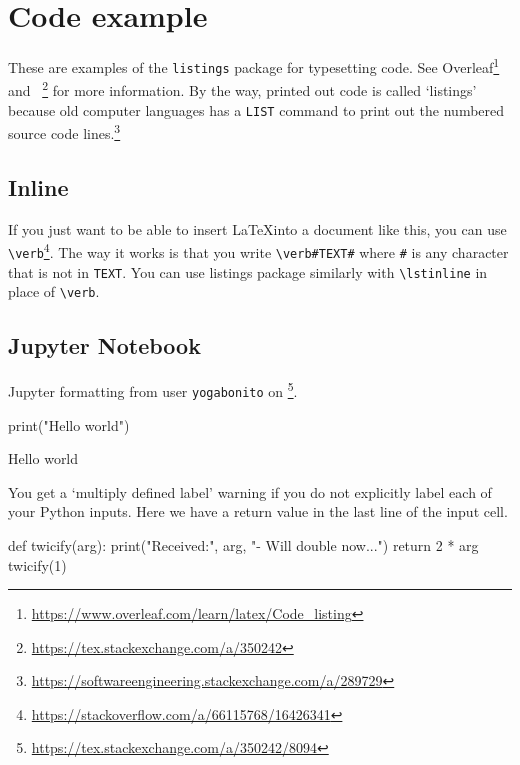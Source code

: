 
\section{Code example}

These are examples of the \texttt{listings} package for typesetting code. See Overleaf\footnote{\url{https://www.overleaf.com/learn/latex/Code_listing}} and ~\footnote{\url{https://tex.stackexchange.com/a/350242}} for more information. By the way, printed out code is called `listings' because old computer languages has a \texttt{LIST} command to print out the numbered source code lines.\footnote{\url{https://softwareengineering.stackexchange.com/a/289729}}

\subsection{Inline}

If you just want to be able to insert \LaTeX into a document like this, you can use \verb!\verb!\footnote{\url{https://stackoverflow.com/a/66115768/16426341}}. The way it works is that you write \verb!\verb#TEXT#! where \verb!#! is any character that is not in \texttt{TEXT}. You can use listings package similarly with \verb!\lstinline! in place of \verb!\verb!.


\subsection{Jupyter Notebook}

Jupyter formatting from user \texttt{yogabonito} on \footnote{\url{https://tex.stackexchange.com/a/350242/8094}}.

\begin{pyin}%
print("Hello world")
\end{pyin}
%  
\begin{pyprint}
Hello world
\end{pyprint}
% 
You get a `multiply defined label' warning if you do not explicitly label each of your Python inputs. 
% 
% 
Here we have a return value in the last line of the input cell.
\begin{pyin}[labelOfTheSecondInput]
def twicify(arg):
    print("Received:", arg, "- Will double now...")
    return 2 * arg
twicify(1)
\end{pyin}

